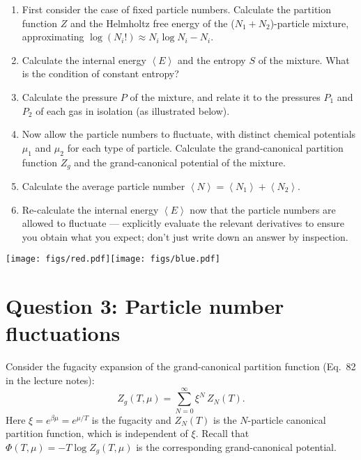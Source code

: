 \documentclass[12 pt]{article} %
\newcommand{\be}{\ensuremath{\beta} }
\newcommand{\vev}[1]{\ensuremath{\left\langle #1 \right\rangle} }
\newcommand{\showmarks}[1]{\rightline{\texttt{[#1 marks]}}} %
\begin{document}
\begin{enumerate}[label={(\alph*)}]
  \item First consider the case of fixed particle numbers.
        Calculate the partition function $Z$ and the Helmholtz free energy of the ($N_1 + N_2$)-particle mixture, approximating $\log(N_i!) \approx N_i\log N_i - N_i$.

  \showmarks{4}

  \item Calculate the internal energy $\vev{E}$ and the entropy $S$ of the mixture.
        What is the condition of constant entropy?

  \showmarks{4}

  \item Calculate the pressure $P$ of the mixture, and relate it to the pressures $P_1$ and $P_2$ of each gas in isolation (as illustrated below).

  \showmarks{4}

  \item Now allow the particle numbers to fluctuate, with distinct chemical potentials $\mu_1$ and $\mu_2$ for each type of particle.
        Calculate the grand-canonical partition function $Z_g$ and the grand-canonical potential of the mixture.

  \showmarks{4}

  \item Calculate the average particle number $\vev{N} = \vev{N_1} + \vev{N_2}$.

  \showmarks{5}

  \item Re-calculate the internal energy $\vev{E}$ now that the particle numbers are allowed to fluctuate --- explicitly evaluate the relevant derivatives to ensure you obtain what you expect; don't just write down an answer by inspection.

  \showmarks{5}
\end{enumerate}

\begin{center}\texttt{[image: figs/red.pdf]}\hspace{0.3\textwidth}\texttt{[image: figs/blue.pdf]}\end{center}



\newpage
\section*{Question 3: Particle number fluctuations}
Consider the fugacity expansion of the grand-canonical partition function (Eq.~82 in the lecture notes):
\begin{equation*}
  Z_g(T, \mu) = \sum_{N = 0}^{\infty} \xi^N \, Z_N(T).
\end{equation*}
Here $\xi = e^{\be \mu} = e^{\mu / T}$ is the fugacity and $Z_N(T)$ is the $N$-particle canonical partition function, which is independent of $\xi$.
Recall that $\Phi(T, \mu) = -T \log Z_g(T, \mu)$ is the corresponding grand-canonical potential.
\end{document}
